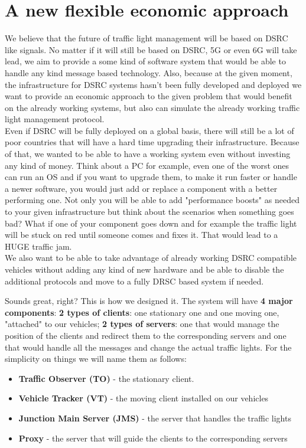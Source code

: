 \documentclass[17pt]{report}
\begin{document}
\chapter{A new flexible economic approach}
\indent \indent
We believe that the future of traffic light management will be
based on DSRC like signals. No matter if it will still be based 
on DSRC, 5G or even 6G will take lead, we aim to provide a some kind of
software system that would be able to handle any kind message based 
technology. Also, because at the given moment, the infrastructure for
DSRC systems hasn't been fully developed and deployed we want to
provide an economic approach to the given problem that would benefit
on the already working systems, but also can simulate the already
working traffic light management protocol.\\
\indent \indent
Even if DSRC will be fully deployed on a global basis, there will still be
a lot of poor countries that will have a hard time upgrading their infrastructure.
Because of that, we wanted to be able to have a working system even without 
investing any kind of money. Think about a PC for example, even one of the worst
ones can run an OS and if you want to upgrade them, to make it run faster or
handle a newer software, you would just add or replace a component with a better
performing one. Not only you will be able to add "performance boosts" as needed
to your given infrastructure but think about the scenarios when something goes bad?
What if one of your component goes down and for example the traffic light will
be stuck on red until someone comes and fixes it. That would lead to a
HUGE traffic jam.\\
\indent \indent
We also want to be able to take advantage of already working DSRC compatible
vehicles without adding any kind of new hardware  and be able to 
disable the additional protocols and move to a fully DRSC based
system if needed.

Sounds great, right? This is how we designed it. The system will have \textbf{4 major
components}: \textbf{2 types of clients}: one stationary one and one moving one, 
"attached" to our vehicles; \textbf{2 types of servers}: one that would manage the
position of the clients and redirect them to the corresponding servers
and one that would handle all the messages and change the actual traffic lights.
For the simplicity on things we will name them as follows:
\begin{itemize}
    \item \textbf{Traffic Observer (TO)} - the stationary client.
    \item \textbf{Vehicle Tracker (VT)} - the moving client installed on our vehicles
    \item \textbf{Junction Main Server (JMS)} - the server that handles the traffic lights
    \item \textbf{Proxy} - the server that will guide the clients to the corresponding
    servers
\end{itemize}
\end{document}
